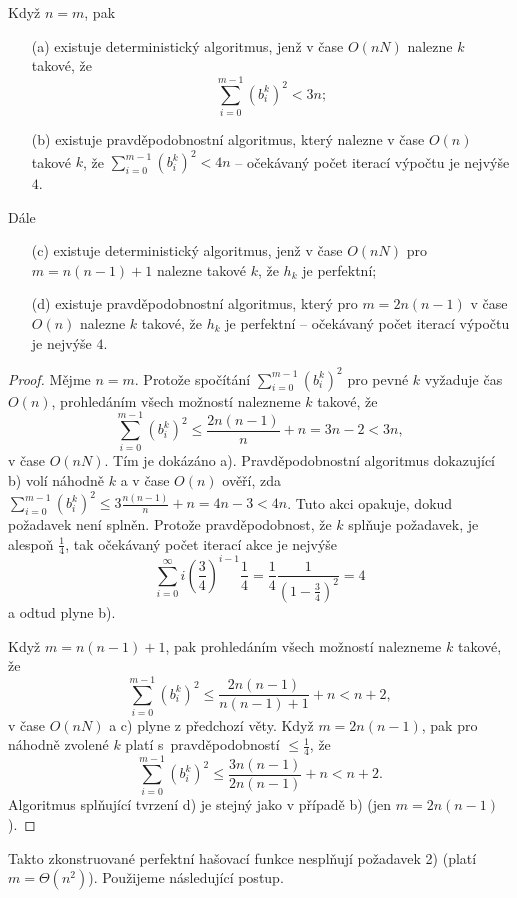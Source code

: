 \documentclass[a4paper,12pt]{article}
\begin{document}
\begin{tvrzeni}Když $n=m$, pak 
\begin{enumerate}
\item[(a)]
existuje deterministický algoritmus, jenž v čase $O(nN)$ 
nalezne $k$ takové, že 
$$\sum_{i=0}^{m-1}(b_i^k)^2<3n;$$
\item[(b)]
existuje pravděpodobnostní algoritmus, který 
nalezne v čase $O(n)$ takové $k$, že $\sum_{i=0}^{m-1}(b_
i^k)^2<4n$ -- očekávaný počet iterací výpočtu je nejvýše $
4$.
\end{enumerate}
Dále 
\begin{enumerate}
\item[(c)]
existuje deterministický algoritmus, jenž v čase $O(nN)$ pro 
$m=n(n-1)+1$ nalezne takové $k$, že $h_k$ je 
perfektní;
\item[(d)]
existuje pravděpodobnostní algoritmus, který pro 
$m=2n(n-1)$ v čase $O(n)$ nalezne $k$ takové, že $h_k$ je 
perfektní -- očekávaný počet iterací výpočtu 
je nejvýše $4$.
\end{enumerate}
\end{tvrzeni}

\begin{proof}Mějme $n=m$. Protože spočítání 
$\sum_{i=0}^{m-1}(b_i^k)^2$ pro pevné $k$ vyžaduje čas $O
(n)$, prohledáním 
všech možností nalez\-ne\-me $k$ takové, že 
$$\sum_{i=0}^{m-1}(b_i^k)^2\le\frac {2n(n-1)}n+n=3n-2<3n,$$
v čase $O(nN)$. Tím je 
dokázáno a). Pravděpodobnostní algoritmus dokazující b) volí 
náhodně $k$ a v čase $O(n)$ ověří, zda 
$\sum_{i=0}^{m-1}(b_i^k)^2\le 3\frac {n(n-1)}n+n=4n-3<4n$. Tuto akci opakuje, dokud 
požadavek není splněn. Protože pravděpodobnost, že $
k$ splňuje 
požadavek, je alespoň $\frac 14$, tak očekávaný počet ite\-rací 
akce je nejvýše 
$$\sum_{i=0}^{\infty}i(\frac 34)^{i-1}\frac 14=\frac 14\frac 1{(1
-\frac 34)^2}=4$$
a odtud plyne b). 

Když $m=n(n-1)+1$, pak prohledáním všech možností 
nalezne\-me $k$ takové, že 
$$\sum_{i=0}^{m-1}(b_i^k)^2\le\frac {2n(n-1)}{n(n-1)+1}+n<n+2,$$
 v 
čase $O(nN)$ a c) plyne z předchozí věty. Když 
$m=2n(n-1)$, pak pro náhodně zvolené $k$ platí s~pravděpodobností $\le\frac 14$, že 
$$\sum_{i=0}^{m-1}(b_i^k)^2\le\frac {3n(n-1)}{2n(n-1)}+n<n+2.$$
Algoritmus splňující tvrzení d) je stejný jako 
v případě b) (jen $m=2n(n-1)$).
\end{proof}

Takto zkonstruované perfektní hašovací funkce 
nesplňují poža\-davek 2) (platí $m=\Theta (n^2)$).  Použijeme následující 
postup. 
\end{document}
